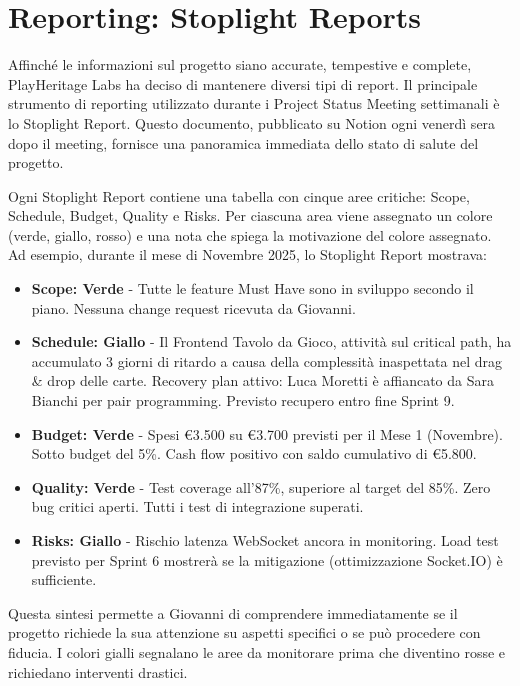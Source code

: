 \section{Reporting: Stoplight Reports}

Affinché le informazioni sul progetto siano accurate, tempestive e complete, PlayHeritage Labs ha deciso di mantenere diversi tipi di report. Il principale strumento di reporting utilizzato durante i Project Status Meeting settimanali è lo Stoplight Report. Questo documento, pubblicato su Notion ogni venerdì sera dopo il meeting, fornisce una panoramica immediata dello stato di salute del progetto.

Ogni Stoplight Report contiene una tabella con cinque aree critiche: Scope, Schedule, Budget, Quality e Risks. Per ciascuna area viene assegnato un colore (verde, giallo, rosso) e una nota che spiega la motivazione del colore assegnato. Ad esempio, durante il mese di Novembre 2025, lo Stoplight Report mostrava:

\begin{itemize}
    \item \textbf{Scope: Verde} - Tutte le feature Must Have sono in sviluppo secondo il piano. Nessuna change request ricevuta da Giovanni.
    \item \textbf{Schedule: Giallo} - Il Frontend Tavolo da Gioco, attività sul critical path, ha accumulato 3 giorni di ritardo a causa della complessità inaspettata nel drag \& drop delle carte. Recovery plan attivo: Luca Moretti è affiancato da Sara Bianchi per pair programming. Previsto recupero entro fine Sprint 9.
    \item \textbf{Budget: Verde} - Spesi €3.500 su €3.700 previsti per il Mese 1 (Novembre). Sotto budget del 5\%. Cash flow positivo con saldo cumulativo di €5.800.
    \item \textbf{Quality: Verde} - Test coverage all'87\%, superiore al target del 85\%. Zero bug critici aperti. Tutti i test di integrazione superati.
    \item \textbf{Risks: Giallo} - Rischio latenza WebSocket ancora in monitoring. Load test previsto per Sprint 6 mostrerà se la mitigazione (ottimizzazione Socket.IO) è sufficiente.
\end{itemize}

Questa sintesi permette a Giovanni di comprendere immediatamente se il progetto richiede la sua attenzione su aspetti specifici o se può procedere con fiducia. I colori gialli segnalano le aree da monitorare prima che diventino rosse e richiedano interventi drastici.

